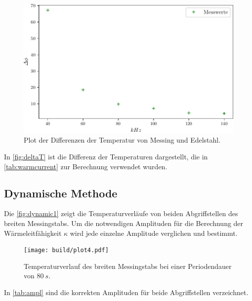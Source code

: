 \begin{figure}
    \centering
    \includegraphics[scale=0.7]{build/plot3.pdf}
    \caption{Plot der Differenzen der Temperatur von Messing und Edelstahl.}
    \label{fig:deltaT}
\end{figure}
In \autoref{fig:deltaT} ist die Differenz der Temperaturen dargestellt, die in \autoref{tab:warmcurrent} zur Berechnung verwendet wurden.

\newpage
\subsection{Dynamische Methode}
Die \autoref{fig:dynamic1} zeigt die Temperaturverläufe von beiden Abgriffstellen des breiten Messingstabs.
Um die notwendigen Amplituden für die Berechnung der Wärmeleitfähigkeit $\kappa$ wird jede einzelne Amplitude verglichen und bestimmt.

\begin{figure}[htbp]
    \centering
    \texttt{[image: build/plot4.pdf]}
    \caption{Temperaturverlauf des breiten Messingstabs bei einer Periodendauer von $80\ s$.}
    \label{fig:dynamic1}
\end{figure}

In \autoref{tab:ampl} sind die korrekten Amplituden für beide Abgriffstellen verzeichnet.

